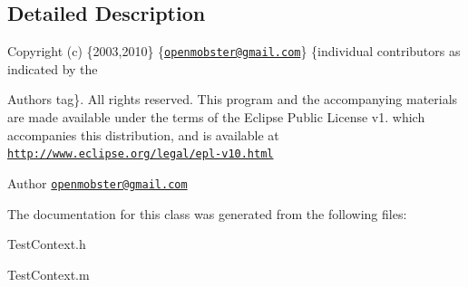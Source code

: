 \subsection{\-Detailed \-Description}
\-Copyright (c) \{2003,2010\} \{\href{mailto:openmobster@gmail.com}{\tt openmobster@gmail.\-com}\} \{individual contributors as indicated by the \begin{DoxyAuthor}{\-Authors}
tag\}. \-All rights reserved. \-This program and the accompanying materials are made available under the terms of the \-Eclipse \-Public \-License v1. which accompanies this distribution, and is available at \href{http://www.eclipse.org/legal/epl-v10.html}{\tt http\-://www.\-eclipse.\-org/legal/epl-\/v10.\-html}
\end{DoxyAuthor}
\begin{DoxyAuthor}{\-Author}
\href{mailto:openmobster@gmail.com}{\tt openmobster@gmail.\-com} 
\end{DoxyAuthor}


\-The documentation for this class was generated from the following files\-:\begin{DoxyCompactItemize}
\item 
\-Test\-Context.\-h\item 
\-Test\-Context.\-m\end{DoxyCompactItemize}
